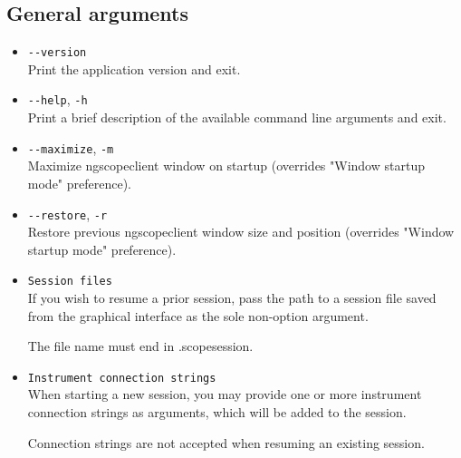 \subsection{General arguments}
\begin{itemize}

\item \texttt{-{}-version}\\
Print the application version and exit.

\item \texttt{-{}-help}, \texttt{-h}\\
Print a brief description of the available command line arguments and exit.

\item \texttt{-{}-maximize}, \texttt{-m}\\
Maximize ngscopeclient window on startup (overrides "Window startup mode" preference).

\item \texttt{-{}-restore}, \texttt{-r}\\
Restore previous ngscopeclient window size and position (overrides "Window startup mode" preference).

\item \texttt{Session files}\\
If you wish to resume a prior session, pass the path to a session file saved from the graphical interface as the sole non-option argument.

The file name must end in .scopesession.

\item \texttt{Instrument connection strings}\\
When starting a new session, you may provide one or more instrument connection strings as arguments, which will be added to the session.

Connection strings are not accepted when resuming an existing session.

\end{itemize}


